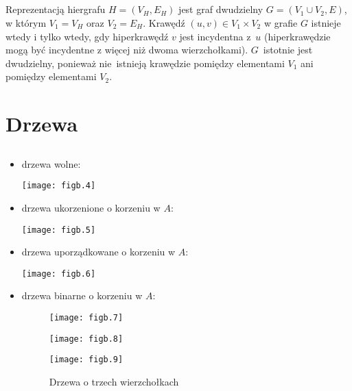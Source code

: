 \subsection{} %
Reprezentacją hiergrafu $H=(V_H,E_H)$ jest graf dwudzielny $G=(V_1\cup V_2,E)$, w którym $V_1=V_H$ oraz $V_2=E_H$. Krawędź $(u,v)\in V_1\times V_2$ w grafie $G$ istnieje wtedy i tylko wtedy, gdy hiperkrawędź $v$ jest incydentna z~$u$ (hiperkrawędzie mogą być incydentne z więcej niż dwoma wierzchołkami). $G$~istotnie jest dwudzielny, ponieważ nie~istnieją krawędzie pomiędzy elementami $V_1$ ani pomiędzy elementami $V_2$.

\section{Drzewa}

\subsection{} %
\begin{itemize}
	\item drzewa wolne:
	\begin{center}
		\texttt{[image: figb.4]}
	\end{center}
	\item drzewa ukorzenione o korzeniu w $A$:
	\begin{center}
		\texttt{[image: figb.5]}
	\end{center}
	\item drzewa uporządkowane o korzeniu w $A$:
	\begin{center}
		\texttt{[image: figb.6]}
	\end{center}
	\item drzewa binarne o korzeniu w $A$:
	\begin{figure}[h]
		\begin{center}
			\texttt{[image: figb.7]} \\
		\end{center}
		\begin{center}
			\texttt{[image: figb.8]} \\
		\end{center}
		\begin{center}
			\texttt{[image: figb.9]}
		\end{center}
		\caption{Drzewa o trzech wierzchołkach}
	\end{figure}
\end{itemize}

